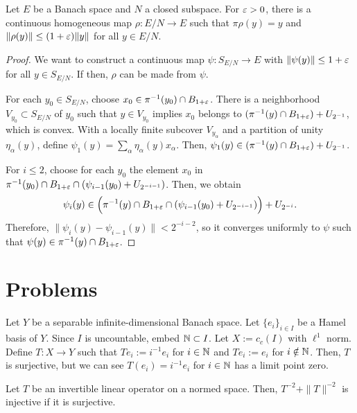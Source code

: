 \documentclass{../../large}
\begin{document}
\begin{prb}
Let $E$ be a Banach space and $N$ a closed subspace.
For $\varepsilon>0$, there is a continuous homogeneous map $\rho:E/N\to E$ such that $\pi\rho(y)=y$ and $\|\rho(y)\|\le(1+\varepsilon)\|y\|$ for all $y\in E/N$.
\end{prb}
\begin{proof}
We want to construct a continuous map $\psi:S_{E/N}\to E$ with $\|\psi(y)\|\le1+\varepsilon$ for all $y\in S_{E/N}$.
If then, $\rho$ can be made from $\psi$.

For each $y_0\in S_{E/N}$, choose $x_0\in\pi^{-1}(y_0)\cap B_{1+\varepsilon}$.
There is a neighborhood $V_{y_0}\subset S_{E/N}$ of $y_0$ such that $y\in V_{y_0}$ implies $x_0$ belongs to $(\pi^{-1}(y)\cap B_{1+\varepsilon})+U_{2^{-1}}$, which is convex.
With a locally finite subcover $V_{y_\alpha}$ and a partition of unity $\eta_\alpha(y)$, define $\psi_1(y)=\sum_\alpha\eta_\alpha(y)x_\alpha$.
Then, $\psi_1(y)\in(\pi^{-1}(y)\cap B_{1+\varepsilon})+U_{2^{-1}}$.

For $i\le2$, choose for each $y_0$ the element $x_0$ in $\pi^{-1}(y_0)\cap B_{1+\varepsilon}\cap(\psi_{i-1}(y_0)+U_{2^{-{i-1}}})$.
Then, we obtain
\[\psi_i(y)\in\Bigl(\pi^{-1}(y)\cap B_{1+\varepsilon}\cap(\psi_{i-1}(y_0)+U_{2^{-{i-1}}})\Bigr)+U_{2^{-i}}.\]
Therefore, $\|\psi_i(y)-\psi_{i-1}(y)\|<2^{-{i-2}}$, so it converges uniformly to $\psi$ such that $\psi(y)\in\pi^{-1}(y)\cap B_{1+\varepsilon}$.
\end{proof}

\section*{Problems}


Let $Y$ be a separable infinite-dimensional Banach space.
Let $\{e_i\}_{i\in I}$ be a Hamel basis of $Y$.
Since $I$ is uncountable, embed $\mathbb{N}\subset I$.
Let $X:=c_c(I)$ with $\ell^1$ norm.
Define $T:X\to Y$ such that $Te_i:=i^{-1}e_i$ for $i\in\mathbb{N}$ and $Te_i:=e_i$ for $i\notin\mathbb{N}$.
Then, $T$ is surjective, but we can see $T(e_i)=i^{-1}e_i$ for $i\in\mathbb{N}$ has a limit point zero.

\begin{prb}
Let $T$ be an invertible linear operator on a normed space.
Then, $T^{-2}+\|T\|^{-2}$ is injective if it is surjective.
\end{prb}
\end{document}
